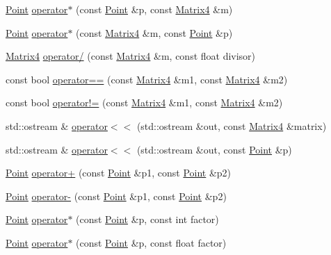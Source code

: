 \begin{DoxyCompactItemize}
\item 
\hyperlink{classprism_1_1_point}{Point} \hyperlink{namespaceprism_a44373b8bda7131a90d04eef7e455ea6f}{operator$\ast$} (const \hyperlink{classprism_1_1_point}{Point} \&p, const \hyperlink{classprism_1_1_matrix4}{Matrix4} \&m)
\item 
\hyperlink{classprism_1_1_point}{Point} \hyperlink{namespaceprism_a82522932359d2381607cf1fe0c898011}{operator$\ast$} (const \hyperlink{classprism_1_1_matrix4}{Matrix4} \&m, const \hyperlink{classprism_1_1_point}{Point} \&p)
\item 
\hyperlink{classprism_1_1_matrix4}{Matrix4} \hyperlink{namespaceprism_a517b4bc9b0ccc23f79b744d93b540fa6}{operator/} (const \hyperlink{classprism_1_1_matrix4}{Matrix4} \&m, const float divisor)
\item 
const bool \hyperlink{namespaceprism_a8804ec2ab8dda9441d64e947f05e293c}{operator==} (const \hyperlink{classprism_1_1_matrix4}{Matrix4} \&m1, const \hyperlink{classprism_1_1_matrix4}{Matrix4} \&m2)
\item 
const bool \hyperlink{namespaceprism_a4d184994eec61a1511fc936a9facb69a}{operator!=} (const \hyperlink{classprism_1_1_matrix4}{Matrix4} \&m1, const \hyperlink{classprism_1_1_matrix4}{Matrix4} \&m2)
\item 
std\+::ostream \& \hyperlink{namespaceprism_ab65e15b3e601e0570beb49a11610c671}{operator$<$$<$} (std\+::ostream \&out, const \hyperlink{classprism_1_1_matrix4}{Matrix4} \&matrix)
\item 
std\+::ostream \& \hyperlink{namespaceprism_acb9fe7ab8ef5f1ee0338e3b057624393}{operator$<$$<$} (std\+::ostream \&out, const \hyperlink{classprism_1_1_point}{Point} \&p)
\item 
\hyperlink{classprism_1_1_point}{Point} \hyperlink{namespaceprism_a49e983b5c32c93114583309eda19dc2b}{operator+} (const \hyperlink{classprism_1_1_point}{Point} \&p1, const \hyperlink{classprism_1_1_point}{Point} \&p2)
\item 
\hyperlink{classprism_1_1_point}{Point} \hyperlink{namespaceprism_a505cbd94f024ad80136afe0b751da08a}{operator-\/} (const \hyperlink{classprism_1_1_point}{Point} \&p1, const \hyperlink{classprism_1_1_point}{Point} \&p2)
\item 
\hyperlink{classprism_1_1_point}{Point} \hyperlink{namespaceprism_a40976ce143923309d4c737bb8288d9e5}{operator$\ast$} (const \hyperlink{classprism_1_1_point}{Point} \&p, const int factor)
\item 
\hyperlink{classprism_1_1_point}{Point} \hyperlink{namespaceprism_a96e41c0858ff4149eafa1bc878dabb7c}{operator$\ast$} (const \hyperlink{classprism_1_1_point}{Point} \&p, const float factor)

\end{DoxyCompactItemize}
